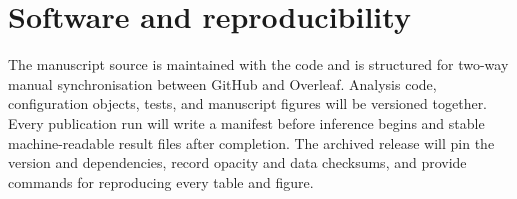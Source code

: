 \section{Software and reproducibility}
\label{sec:reproducibility}

The manuscript source is maintained with the \ROBERT{} code and is structured
for two-way manual synchronisation between GitHub and Overleaf. Analysis code,
configuration objects, tests, and manuscript figures will be versioned together.
Every publication run will write a manifest before inference begins and stable
machine-readable result files after completion. The archived release will pin
the  version and dependencies, record opacity and data
checksums, and provide commands for reproducing every table and figure.


